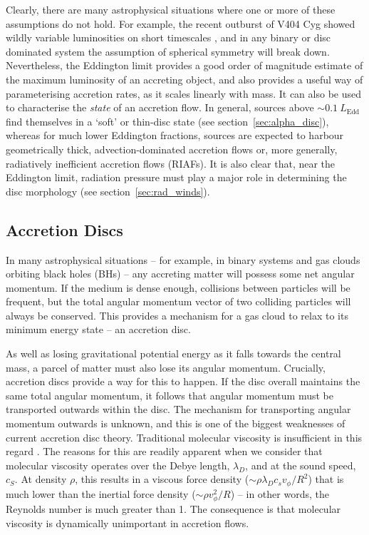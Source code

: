Clearly, there are many astrophysical situations where one or more
of these assumptions do not hold.
For example, the recent outburst of V404 Cyg showed wildly variable
luminosities on short timescales 
\citep[see, e.g.,][among many, many Astronomer's Telegrams]{kuulkers_atel2015,motta_atel2015}, 
and in any binary
or disc dominated system the assumption of spherical symmetry will
break down. Nevertheless, the Eddington limit provides a good order of magnitude 
estimate of the maximum luminosity of an accreting object,
and also provides a useful way of parameterising accretion rates,
as it scales linearly with mass. It can also be used
to characterise the {\em state} of an accretion flow.  
In general, sources above $\sim 0.1~L_{\mathrm{Edd}}$ find themselves in a 
`soft' or thin-disc state (see section~\ref{sec:alpha_disc}), 
whereas for much lower Eddington 
fractions, sources are expected to harbour geometrically thick, 
advection-dominated accretion flows
\citep[ADAFs; ][]{narayan1994,narayan1995} or, more generally, 
radiatively inefficient accretion flows (RIAFs).
It is also clear that, near the Eddington limit, radiation pressure
must play a major role in determining the disc morphology 
(see section~\ref{sec:rad_winds}).

\subsection{Accretion Discs}

In many astrophysical situations -- for example, 
in binary systems and gas clouds orbiting black holes (BHs) --
any accreting matter will possess some net angular momentum.
If the medium is dense enough, collisions between particles will be
frequent, but the total angular momentum vector of two colliding particles
will always be conserved. This provides a mechanism for a gas cloud to relax to 
its minimum energy state -- an accretion disc. 

As well as losing gravitational potential energy as it falls towards 
the central mass, a parcel of matter must also lose its angular momentum. 
Crucially, accretion discs provide a way for this to happen. 
If the disc overall maintains the same total 
angular momentum, it follows that angular momentum must 
be transported outwards within the disc. The mechanism for transporting 
angular momentum outwards is unknown, and this is one of the biggest 
weaknesses of current accretion disc theory. 
Traditional molecular viscosity is insufficient in this regard 
\citep{pringle1981}. The reasons for this are readily apparent
when we consider that molecular viscosity
operates over the Debye length,
$\lambda_D$, and at the sound speed, $c_S$. At density $\rho$, this results in a 
viscous force density ($\sim \rho \lambda_D c_s v_\phi/R^2$) that is much lower 
than the inertial force density ($\sim \rho v_\phi^2/R$) --
in other words, the Reynolds number is much greater than 1. The consequence is that
molecular viscosity is dynamically unimportant in accretion flows.


